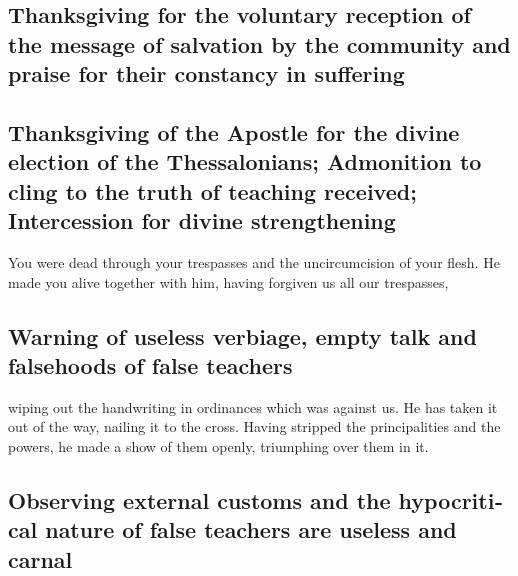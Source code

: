 \begin{paracol}{2}
\begin{otherlanguage}{english}
\hypertarget{thanksgiving-for-the-voluntary-reception-of-the-message-of-salvation-by-the-community-and-praise-for-their-constancy-in-suffering}{%
\subsection{Thanksgiving for the voluntary reception of the message of
salvation by the community and praise for their constancy in
suffering}\label{thanksgiving-for-the-voluntary-reception-of-the-message-of-salvation-by-the-community-and-praise-for-their-constancy-in-suffering}}

\hypertarget{thanksgiving-of-the-apostle-for-the-divine-election-of-the-thessalonians-admonition-to-cling-to-the-truth-of-teaching-received-intercession-for-divine-strengthening}{%
\subsection{Thanksgiving of the Apostle for the divine election of the
Thessalonians; Admonition to cling to the truth of teaching received;
Intercession for divine
strengthening}\label{thanksgiving-of-the-apostle-for-the-divine-election-of-the-thessalonians-admonition-to-cling-to-the-truth-of-teaching-received-intercession-for-divine-strengthening}}

 You were dead through your trespasses and the
uncircumcision of your flesh. He made you alive together with him,
having forgiven us all our trespasses,

\hypertarget{warning-of-useless-verbiage-empty-talk-and-falsehoods-of-false-teachers}{%
\subsection{Warning of useless verbiage, empty talk and falsehoods of
false
teachers}\label{warning-of-useless-verbiage-empty-talk-and-falsehoods-of-false-teachers}}

 wiping out the handwriting in ordinances which was
against us. He has taken it out of the way, nailing it to the cross.
 Having stripped the principalities and the powers, he
made a show of them openly, triumphing over them in it.

\hypertarget{observing-external-customs-and-the-hypocritical-nature-of-false-teachers-are-useless-and-carnal}{%
\subsection{Observing external customs and the hypocritical nature of
false teachers are useless and
carnal}\label{observing-external-customs-and-the-hypocritical-nature-of-false-teachers-are-useless-and-carnal}}


\end{otherlanguage}
\end{paracol}

